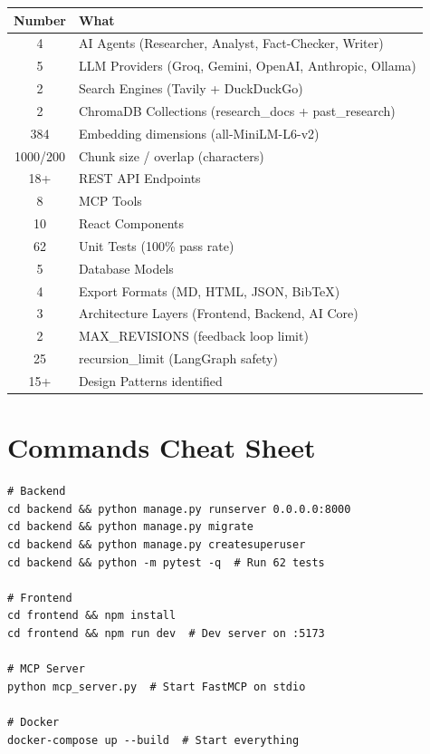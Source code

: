 \documentclass[11pt,a4paper,twoside]{report}
\begin{document}
\begin{center}
\begin{tabular}{|c|l|}
\hline
\textbf{Number} & \textbf{What} \\
\hline
4 & AI Agents (Researcher, Analyst, Fact-Checker, Writer) \\
\hline
5 & LLM Providers (Groq, Gemini, OpenAI, Anthropic, Ollama) \\
\hline
2 & Search Engines (Tavily + DuckDuckGo) \\
\hline
2 & ChromaDB Collections (research\_docs + past\_research) \\
\hline
384 & Embedding dimensions (all-MiniLM-L6-v2) \\
\hline
1000/200 & Chunk size / overlap (characters) \\
\hline
18+ & REST API Endpoints \\
\hline
8 & MCP Tools \\
\hline
10 & React Components \\
\hline
62 & Unit Tests (100\% pass rate) \\
\hline
5 & Database Models \\
\hline
4 & Export Formats (MD, HTML, JSON, BibTeX) \\
\hline
3 & Architecture Layers (Frontend, Backend, AI Core) \\
\hline
2 & MAX\_REVISIONS (feedback loop limit) \\
\hline
25 & recursion\_limit (LangGraph safety) \\
\hline
15+ & Design Patterns identified \\
\hline
\end{tabular}
\end{center}

\section{Commands Cheat Sheet}

\begin{lstlisting}[language={},caption={Essential Development Commands}]
# Backend
cd backend && python manage.py runserver 0.0.0.0:8000
cd backend && python manage.py migrate
cd backend && python manage.py createsuperuser
cd backend && python -m pytest -q  # Run 62 tests

# Frontend
cd frontend && npm install
cd frontend && npm run dev  # Dev server on :5173

# MCP Server
python mcp_server.py  # Start FastMCP on stdio

# Docker
docker-compose up --build  # Start everything
\end{lstlisting}
\end{document}
